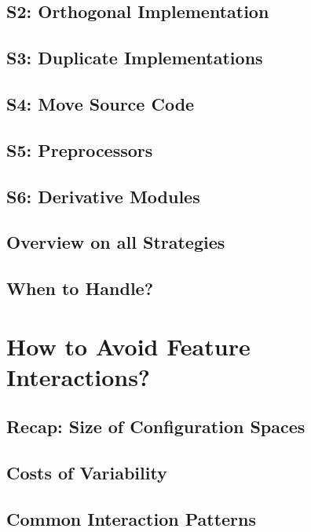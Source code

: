 \documentclass[
	aspectratio=169, %
	8pt, %
	handout, %
]{beamer}
\begin{document}
\subsection{S2: Orthogonal Implementation}
\subsection{S3: Duplicate Implementations}
\subsection{S4: Move Source Code}
\subsection{S5: Preprocessors}
\subsection{S6: Derivative Modules}
\subsection{Overview on all Strategies}
\subsection{When to Handle?}

%

\lessonslearned{
	\item \ldots
}{
	\item \ldots
}{
	\ldots
}

\sectionend

\section{How to Avoid Feature Interactions?}

\subsection{Recap: Size of Configuration Spaces}
\subsection{Costs of Variability}
\subsection{Common Interaction Patterns}
\end{document}
